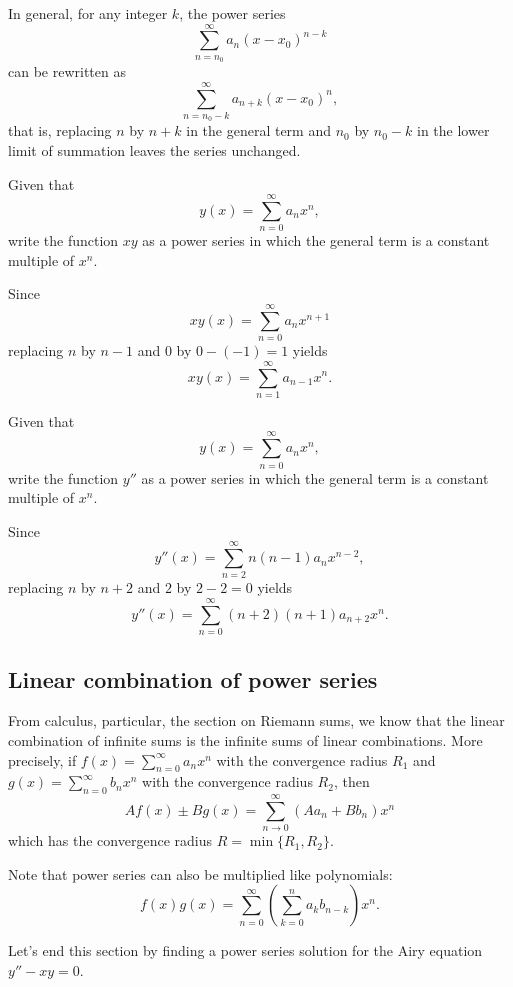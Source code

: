 In general, for any integer $k$, the power series
\[\sum\limits_{n = n_0}^\infty a_n ( x - x_0)^{n - k}\]
can be rewritten as
\[\sum\limits_{n = n_0-k}^\infty a_{n+k} ( x - x_0)^{n},\]
that is, replacing $n$ by $n + k$ in the general term and $n_0$ by $n_0-k$ in the lower limit of summation leaves the series unchanged.

\begin{example}
Given that
\[y(x)=\sum_{n=0}^\infty a_nx^n,\]
write the function $xy$ as a power series in which the general term is a constant multiple of $x^n$.
\end{example}
\begin{solution}
  Since 
  \[xy(x)=\sum_{n=0}^\infty a_nx^{n+1}\]
  replacing $n$ by $n-1$ and $0$ by $0-(-1)=1$ yields
  \[xy(x)=\sum_{n=1}^\infty a_{n-1}x^n.\]
\end{solution}

\begin{exercise}
Given that
\[y(x)=\sum_{n=0}^\infty a_nx^n,\]
write the function $y''$ as a power series in which the general term is a constant multiple of $x^n$.
\end{exercise}
\begin{exersol}
Since
  \[y''(x)=\sum_{n=2}^\infty n(n-1)a_nx^{n-2},\]
replacing $n$ by $n+2$ and $2$ by $2-2=0$ yields
\[y''(x)=\sum_{n=0}^\infty (n+2)(n+1)a_{n+2}x^n.\]
\end{exersol}

\subsection*{Linear combination of power series}

From calculus, particular, the section on Riemann sums, we know that the linear combination of infinite sums is the infinite sums of linear combinations. More precisely, if $f(x)=\sum\limits_{n=0}^\infty a_nx^n$ with the convergence radius $R_1$ and $g(x)=\sum\limits_{n=0}^\infty b_nx^n$ with the convergence radius $R_2$, then
\[Af(x)\pm Bg(x)=\sum\limits_{n\to 0}^\infty (Aa_n+Bb_n)x^n\] 
which has the convergence radius $R=\min\{R_1, R_2\}$.

Note that power series can also be multiplied like polynomials:
\[f(x)g(x)=\sum\limits_{n=0}^\infty\left(\sum\limits_{k=0}^n a_kb_{n-k}\right)x^n.\]

Let's end this section by finding a power series solution for the Airy equation $y''-xy=0$. 

